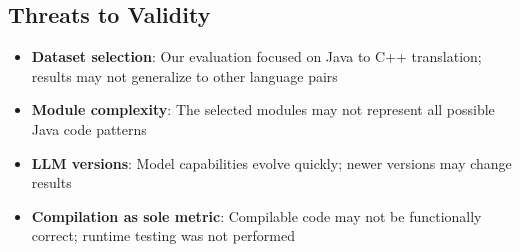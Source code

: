 \subsection{Threats to Validity}

\begin{itemize}
\item \textbf{Dataset selection}: Our evaluation focused on Java to C++ translation; results may not generalize to other language pairs
\item \textbf{Module complexity}: The selected modules may not represent all possible Java code patterns
\item \textbf{LLM versions}: Model capabilities evolve quickly; newer versions may change results
\item \textbf{Compilation as sole metric}: Compilable code may not be functionally correct; runtime testing was not performed
\end{itemize}
